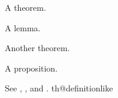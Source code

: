 \begin{theorem}\flmLabels{\label{ref1}}
A theorem.
\end{theorem}

\begin{lemma}\flmLabels{\label{ref2}}\noproofref A lemma.
\end{lemma}

\begin{theorem}\flmLabels{\label{ref3}}
Another theorem.
\end{theorem}

\begin{proposition}\flmLabels{\label{ref4}}\noproofref A proposition.
\end{proposition}

See , ,  and .
\RequirePackage[thmset=empty]{phfthm}
\RequirePackage{zref-clever}
\ProvideDocumentCommand\noproofref{}{}
\ifcsname th@definitionlike\endcsname\else{}\fi
\ProvideDocumentCommand{}
%
